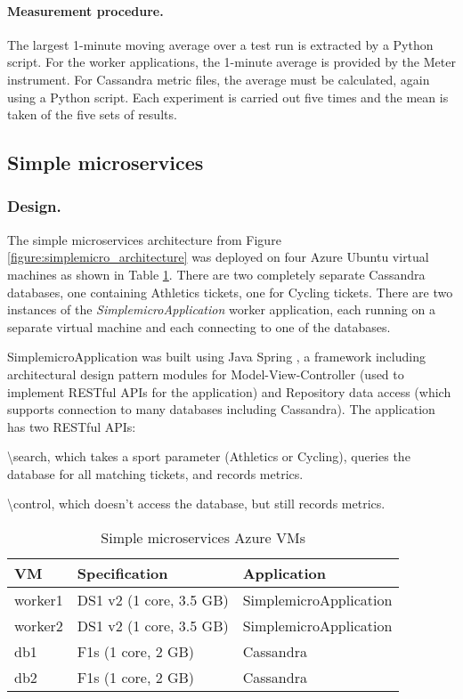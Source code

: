\paragraph{Measurement procedure.} The largest 1-minute moving average over a test run is extracted by a Python script.  For the worker applications, the 1-minute average is provided by the Meter instrument.  For Cassandra metric files, the average must be calculated, again using a Python script.  Each experiment is carried out five times and the mean is taken of the five sets of results.

%
%
\FloatBarrier
\subsection{Simple microservices}

\subsubsection{Design.}  The simple microservices architecture from Figure \ref{figure:simplemicro_architecture} was deployed on four Azure Ubuntu virtual machines as shown in Table \ref{table:builtmicro_vmdesign}.  There are two completely separate Cassandra databases, one containing Athletics tickets, one for Cycling tickets.  There are two instances of the {\itshape SimplemicroApplication} worker application, each running on a separate virtual machine and each connecting to one of the databases.

SimplemicroApplication was built using Java Spring \cite{RN1076}, a framework including architectural design pattern modules for Model-View-Controller (used to implement RESTful APIs for the application) and Repository data access (which supports connection to many databases including Cassandra).  The application has two RESTful APIs:

{\textbackslash search}, which takes a sport parameter (Athletics or Cycling), queries the database for all matching tickets, and records metrics.

{\textbackslash control}, which doesn't access the database, but still records metrics.

\begin{table}[h!]
	\centering
	\caption{Simple microservices Azure VMs}
	\label{table:builtmicro_vmdesign}
	\begin{tabular}{l | l | l}
		VM		& Specification		& Application \\
		\hline
		worker1	& DS1 v2 (1 core, 3.5 GB)	& SimplemicroApplication \\
		worker2	& DS1 v2 (1 core, 3.5 GB)	& SimplemicroApplication \\
		db1		& F1s (1 core, 2 GB)	& Cassandra \\
		db2		& F1s (1 core, 2 GB)	& Cassandra \\
	\end{tabular}
\end{table}

